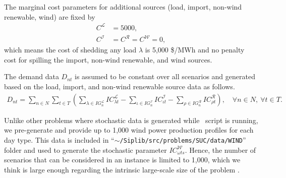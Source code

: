 The marginal cost parameters for additional sources (load, import, non-wind renewable, wind) are fixed by
\begin{align*}
C^\mathcal{L}&=5000,\\
C^\mathcal{I}&=C^\mathcal{R}=C^\mathcal{W}=0,
\end{align*}
which means the cost of shedding any load $\lambda$ is 5,000 \$/MWh and no penalty cost for spilling the import, non-wind renewable, and wind sources.

The demand data $D_{nt}$ is assumed to be constant over all scenarios and generated based on the load, import, and non-wind renewable source data as follows.
\begin{align*}
D_{nt}=\sum_{n\in N} \sum_{t\in T}\left(  \sum_{\lambda\in IG_n^\mathcal{L}}IC_{\lambda t}^\mathcal{L} - \sum_{\iota\in IG_n^\mathcal{I}}IC_{\iota t}^\mathcal{I} - \sum_{\rho\in IG_n^\mathcal{R}}IC_{\rho t}^\mathcal{R}    \right),\quad\forall n\in N,\ \forall t\in T.
\end{align*}

Unlike other problems where stochastic data is generated while \julia\ script is running, we pre-generate and provide up to 1,000 wind power production profiles for each day type. This data is included in ``\texttt{$\sim$/Siplib/src/problems/SUC/data/WIND}'' folder and used to generate the stochastic parameter $IC_{\omega ts}^\mathcal{W}$. Hence, the number of scenarios that can be considered in an instance is limited to 1,000, which we think is large enough regarding the intrinsic large-scale size of the problem \suc.